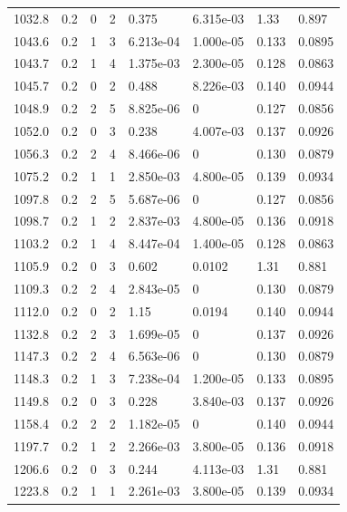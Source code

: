 \documentclass[preview]{standalone}
\begin{document}
{{{{\begin{tabular}{L{1.2cm}C{1.2cm} C{0.3cm}C{0.5cm} C{1.4cm}C{1.4cm} C{1.4cm}C{1.4cm}}
  1032.8  &   0.2  & 0     &  2 &  0.375  & 6.315e-03  & 1.33 &  0.897   \\ 
  1043.6  &   0.2  & 1     &  3 &  6.213e-04  & 1.000e-05  & 0.133 &  0.0895   \\ 
  1043.7  &   0.2  & 1     &  4 &  1.375e-03  & 2.300e-05  & 0.128 &  0.0863   \\ 
  1045.7  &   0.2  & 0     &  2 &  0.488  & 8.226e-03  & 0.140 &  0.0944   \\ 
  1048.9  &   0.2  & 2     &  5 &  8.825e-06  & 0  & 0.127 &  0.0856   \\ 
  1052.0  &   0.2  & 0     &  3 &  0.238  & 4.007e-03  & 0.137 &  0.0926   \\ 
  1056.3  &   0.2  & 2     &  4 &  8.466e-06  & 0  & 0.130 &  0.0879   \\ 
  1075.2  &   0.2  & 1     &  1 &  2.850e-03  & 4.800e-05  & 0.139 &  0.0934   \\ 
  1097.8  &   0.2  & 2     &  5 &  5.687e-06  & 0  & 0.127 &  0.0856   \\ 
  1098.7  &   0.2  & 1     &  2 &  2.837e-03  & 4.800e-05  & 0.136 &  0.0918   \\ 
  1103.2  &   0.2  & 1     &  4 &  8.447e-04  & 1.400e-05  & 0.128 &  0.0863   \\ 
  1105.9  &   0.2  & 0     &  3 &  0.602  & 0.0102  & 1.31 &  0.881   \\ 
  1109.3  &   0.2  & 2     &  4 &  2.843e-05  & 0  & 0.130 &  0.0879   \\ 
  1112.0  &   0.2  & 0     &  2 &  1.15  & 0.0194  & 0.140 &  0.0944   \\ 
  1132.8  &   0.2  & 2     &  3 &  1.699e-05  & 0  & 0.137 &  0.0926   \\ 
  1147.3  &   0.2  & 2     &  4 &  6.563e-06  & 0  & 0.130 &  0.0879   \\ 
  1148.3  &   0.2  & 1     &  3 &  7.238e-04  & 1.200e-05  & 0.133 &  0.0895   \\ 
  1149.8  &   0.2  & 0     &  3 &  0.228  & 3.840e-03  & 0.137 &  0.0926   \\ 
  1158.4  &   0.2  & 2     &  2 &  1.182e-05  & 0  & 0.140 &  0.0944   \\ 
  1197.7  &   0.2  & 1     &  2 &  2.266e-03  & 3.800e-05  & 0.136 &  0.0918   \\ 
  1206.6  &   0.2  & 0     &  3 &  0.244  & 4.113e-03  & 1.31 &  0.881   \\ 
  1223.8  &   0.2  & 1     &  1 &  2.261e-03  & 3.800e-05  & 0.139 &  0.0934   \\ 

\end{tabular}}}}}
\end{document}
